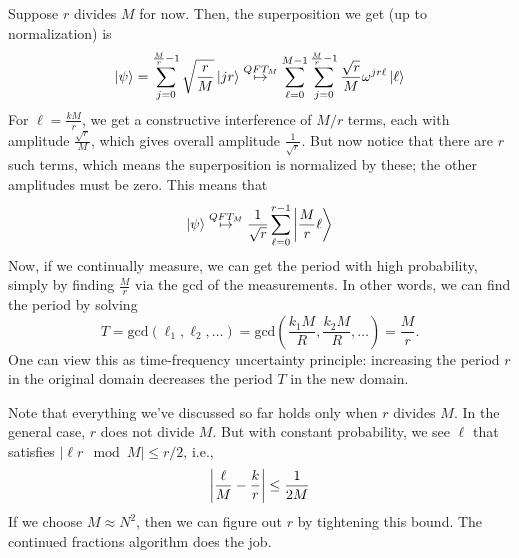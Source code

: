 Suppose $r$ divides $M$ for now. Then, the superposition we get (up to normalization) is
\[ \ket{\psi} = \sum_{j = 0}^{\frac{M}{r} - 1} \sqrt{\frac{r}{M}}\ket{jr} \overset{QFT_M}{\mapsto} \sum_{\ell = 0}^{M - 1} \sum_{j = 0}^{\frac{M}{r} - 1} \frac{\sqrt{r}}{M} \omega^{jr\ell} \ket{\ell} \]
For $\ell = \frac{k M}{r}$, we get a constructive interference of $M/r$ terms, each with amplitude $\frac{\sqrt{r}}{M}$, which gives overall amplitude
$\frac{1}{\sqrt{r}}$. But now notice that there are $r$ such terms, which means the superposition is normalized by these; the other amplitudes must be zero.
This means that 
\[ \ket{\psi} \overset{QFT_M}{\mapsto} \frac{1}{\sqrt{r}} \sum_{\ell = 0}^{r - 1} \ket{\frac{M}{r}\ell}\]
Now, if we continually measure, we can get the period with high probability, simply by finding $\frac{M}{r}$ via the gcd of the measurements. %
In other words, we can find the period by solving
\[T = \mathrm{gcd}\left(\ell_1, \ell_2, \dots\right) = \mathrm{gcd} \left(\frac{k_1 M}{R}, \frac{k_2 M}{R}, \dots\right) = \frac{M}{r}.\]
One can view this as time-frequency uncertainty principle: increasing the period $r$ in the original domain decreases the period $T$ in the new domain.

Note that everything we've discussed so far holds only when $r$ divides $M$. In the general case, $r$ does not divide $M$. But with constant probability, we see $\ell$ that satisfies $|\ell r \mod M| \leq r/2$, i.e.,
\[ \qty|\frac{\ell}{M} - \frac{k}{r}| \leq \frac{1}{2M} \]
If we choose $M \approx N^2$, then we can figure out $r$ by tightening this bound. The continued fractions algorithm does the job.